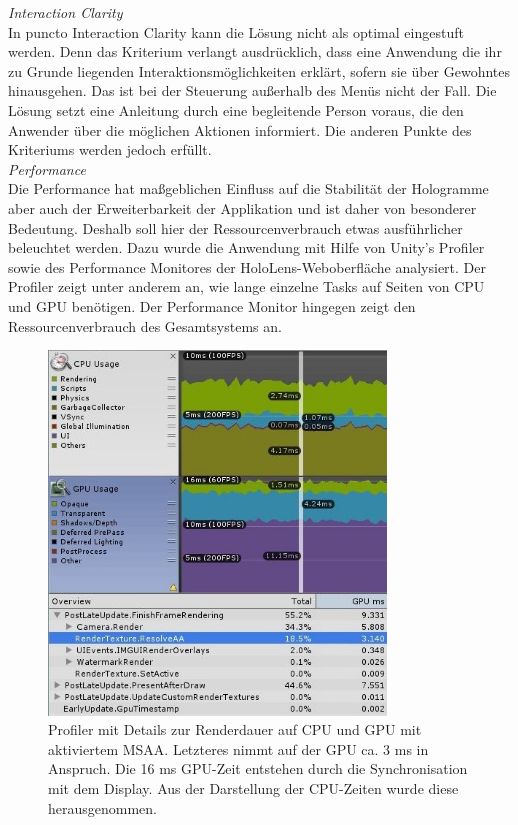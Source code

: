 \textit{Interaction Clarity}\\
In puncto Interaction Clarity kann die Lösung nicht als optimal eingestuft werden. Denn das Kriterium verlangt ausdrücklich, dass eine Anwendung die ihr zu Grunde liegenden Interaktionsmöglichkeiten erklärt, sofern sie über Gewohntes hinausgehen. Das ist bei der Steuerung außerhalb des Menüs nicht der Fall. Die Lösung setzt eine Anleitung durch eine begleitende Person voraus, die den Anwender über die möglichen Aktionen informiert. Die anderen Punkte des Kriteriums werden jedoch erfüllt.\\

\textit{Performance}\\
Die Performance hat maßgeblichen Einfluss auf die Stabilität der Hologramme aber auch der Erweiterbarkeit der Applikation und ist daher von besonderer Bedeutung. Deshalb soll hier der Ressourcenverbrauch etwas ausführlicher beleuchtet werden. Dazu wurde die Anwendung mit Hilfe von Unity's Profiler sowie des Performance Monitores der HoloLens-Weboberfläche analysiert. Der Profiler zeigt unter anderem an, wie lange einzelne Tasks auf Seiten von CPU und GPU benötigen. Der Performance Monitor hingegen zeigt den Ressourcenverbrauch des Gesamtsystems an.\\

\begin{figure}[h!]
	\centering
	\includegraphics[width=0.8\textwidth]{images/performance/profile_MSAA_on_cut.jpg}
	\caption{Profiler mit Details zur Renderdauer auf CPU und GPU mit aktiviertem MSAA. Letzteres nimmt auf der GPU ca. 3 ms in Anspruch. Die 16 ms GPU-Zeit entstehen durch die Synchronisation mit dem Display. Aus der Darstellung der CPU-Zeiten wurde diese herausgenommen.}
	\label{img:profiler}
\end{figure}

